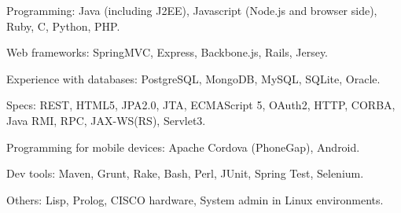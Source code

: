\begin{rlist}
  \item Programming: Java (including J2EE), Javascript (Node.js and
  browser side), Ruby, C, Python, PHP.
  \item Web frameworks: SpringMVC, Express, Backbone.js, Rails, Jersey.
  \item Experience with databases: PostgreSQL, MongoDB, MySQL, SQLite, Oracle.
  \item Specs: REST, HTML5, JPA2.0, JTA, ECMAScript 5, OAuth2, HTTP,
  CORBA, Java RMI, RPC, JAX-WS(RS), Servlet3.
  \item Programming for mobile devices: Apache Cordova (PhoneGap),
  Android.
  \item Dev tools: Maven, Grunt, Rake, Bash, Perl, JUnit, Spring Test,
  Selenium.
  \item Others: Lisp, Prolog, CISCO hardware, System admin in Linux
  environments.
\end{rlist}

